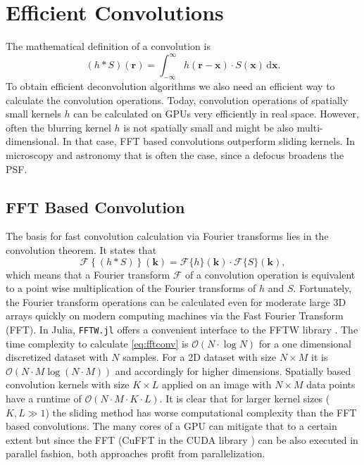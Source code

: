 \documentclass{juliacon}
\begin{document}
\section{Efficient Convolutions}
The mathematical definition of a convolution is
\begin{equation}
    (h * S)(\mathbf r) = \int_{-\infty}^{\infty} h(\mathbf r - \mathbf x) \cdot S(\mathbf x) \, \mathrm d \mathbf x.
    \label{eq:conv}
\end{equation}
To obtain efficient deconvolution algorithms we also need an efficient way to calculate the convolution operations.
Today, convolution operations of spatially small kernels $h$ can be calculated on GPUs very efficiently in real space.
However, often the blurring kernel $h$ is not spatially small and might be also multi-dimensional. In that case, FFT based convolutions
outperform sliding kernels. In microscopy and astronomy that is often the case, since a defocus broadens the PSF.

\subsection{FFT Based Convolution}
    The basis for fast convolution calculation via Fourier transforms lies in the convolution theorem. It states that
    \begin{equation}
        \mathcal F\left\{(h * S)\right\}(\mathbf k) = \mathcal F\{h\} (\mathbf k) \cdot \mathcal F\{S\} (\mathbf k),
        \label{eq:fftconv}
    \end{equation} 
        which means that a Fourier transform $\mathcal F$ of a convolution operation is equivalent to a point wise multiplication of the Fourier transforms 
        of $h$ and $S$.
        Fortunately, the Fourier transform operations can be calculated even for moderate large 3D arrays quickly on modern computing machines via
        the Fast Fourier Transform (FFT).
        In Julia, \verb|FFTW.jl| offers a convenient interface to the FFTW library \cite{FFTW05}.
        The time complexity to calculate \autoref{eq:fftconv} is $\mathcal{O}(N \cdot \log N)$ for a one dimensional discretized dataset with $N$ samples.
        For a 2D dataset with size $N \times M$ it is $\mathcal{O}(N \cdot M \log(N \cdot M))$ and accordingly for higher dimensions.
        Spatially based convolution kernels with size $K \times L$ applied on an image with
        $N \times M$ data points have a runtime of $\mathcal O(N \cdot M \cdot K \cdot L)$.
        It is clear that for larger kernel sizes ($K,L \gg 1$) the sliding method 
        has worse computational complexity than the FFT based convolutions. The many cores of a GPU can mitigate that to a certain extent
        but since the FFT (CuFFT in the CUDA library \cite{CUDA}) can be also executed in parallel fashion, 
        both approaches profit from parallelization.
        
\end{document}
